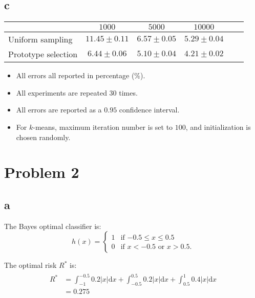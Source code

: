 \documentclass[a4paper,11pt]{article}
\theoremstyle{mytheor}
\begin{document}
\subsection*{c}
\begin{tabular}{|l|c|c|c|c|c|}
	\hline
		&  $1000$  & $5000$ & $10000$  \\ \hline
	Uniform sampling &  $11.45 \pm 0.11$  & $6.57 \pm 0.05 $ & $5.29 \pm 0.04$  \\ \hline 
	Prototype selection & $6.44 \pm 0.06$  &  $5.10 \pm 0.04$ & $4.21 \pm 0.02$  \\ \hline 
\end{tabular}

\begin{itemize}
	\item All errors all reported in percentage ($\%$).
	\item All experiments are repeated $30$ times.
	\item All errors are reported as a $0.95$ confidence interval.
	\item For $k$-means, maximum iteration number is set to $100$, and initialization is chosen randomly.
\end{itemize}

\section*{Problem 2}
\subsection*{a}
The Bayes optimal classifier is:
\begin{equation}
h(x) = \left\{ \begin{array}{ll}
	1 & \mbox{if $-0.5 \leq  x \leq 0.5$}\\
	0 & \mbox{if $x < -0.5$ or $x > 0.5$}.\end{array} \right.
\end{equation}

The optimal risk $R^*$ is:
\begin{align}
	\begin{split}
		R^* & = \int_{-1}^{-0.5} 0.2 |x|  \text{d} x + \int_{-0.5}^{0.5} 0.2 |x|  \text{d} x + \int_{0.5}^{1} 0.4 |x|  \text{d} x \\
			& = 0.275
	\end{split}
\end{align}
\end{document}
